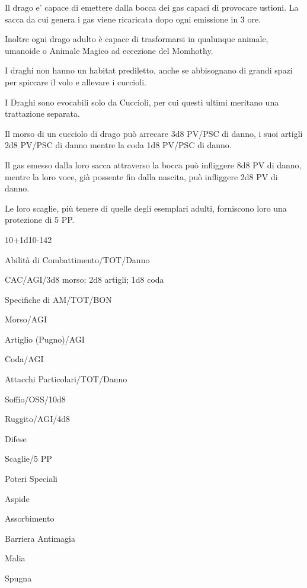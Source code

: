 Il drago e' capace di emettere dalla bocca dei gas capaci di provocare
ustioni. La sacca da cui genera i gas viene ricaricata dopo ogni
emissione in 3 ore.

Inoltre ogni drago adulto \`e capace di trasformarsi in qualunque
animale, umanoide o Animale Magico ad eccezione del Momhothy.

I draghi non hanno un habitat prediletto, anche se abbisognano di
grandi spazi per spiccare il volo e allevare i cuccioli.


I Draghi sono evocabili solo da Cuccioli, per cui questi ultimi
meritano una trattazione separata.

Il morso di un cucciolo di drago pu\`o arrecare 3d8 PV/PSC di danno,
i suoi artigli 2d8 PV/PSC di danno mentre la coda 1d8 PV/PSC di danno.

Il gas emesso dalla loro sacca attraverso la bocca pu\`o infliggere
8d8 PV di danno, mentre la loro voce, gi\`a possente fin dalla
nascita, pu\`o infliggere 2d8 PV di danno.

Le loro scaglie, pi\`u tenere di quelle degli esemplari adulti,
forniscono loro una protezione di 5 PP.

{10+1d10}{-}{142}

\begin{parmostro}{Abilit\`a di Combattimento/TOT/Danno}
\item CAC/AGI/3d8 morso; 2d8 artigli; 1d8 coda
\end{parmostro}

\begin{parmostro}{Specifiche di AM/TOT/BON}
\item Morso/AGI
\item Artiglio (Pugno)/AGI
\item Coda/AGI
\end{parmostro}

\begin{parmostro}{Attacchi Particolari/TOT/Danno}
\item Soffio/OSS/10d8
\item Ruggito/AGI/4d8
\end{parmostro}

\begin{parmostro}{Difese}
\item Scaglie/5 PP
\end{parmostro}

\begin{parmostro}{Poteri Speciali}
\item  Aspide
\item  Assorbimento
\item  Barriera Antimagia
\item  Malia
\item  Spugna
\end{parmostro}

